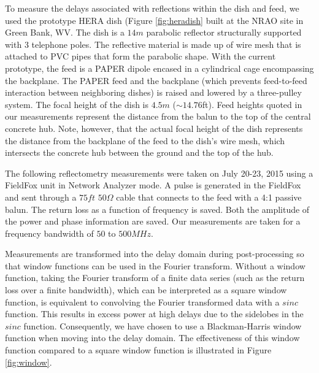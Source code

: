 \documentclass[12pt,preprint]{aastex}
\begin{document}
To measure the delays associated with reflections within the dish and feed, we
used the prototype HERA dish (Figure \ref{fig:heradish} built at the NRAO site in
Green Bank, WV. The dish is a $14m$ parabolic reflector structurally supported
with 3 telephone poles. The reflective material is made up of wire mesh that
is attached to PVC pipes that form the parabolic shape. With the current
prototype, the feed is a PAPER dipole encased in a cylindrical cage encompassing
the backplane. The PAPER feed and the backplane (which prevents feed-to-feed
interaction between neighboring dishes) is raised and lowered by a three-pulley
system. The focal height of the dish is $4.5m$ ($\sim{14.76}$ft). Feed heights quoted in our measurements represent the distance from the balun to the top of the central concrete hub. Note, however, that the actual focal height of the dish represents the distance from the backplane of the feed to the dish's wire mesh, which intersects the concrete hub between the ground and the top of the hub. 

The following reflectometry measurements were taken on July 20-23, 2015 using a
FieldFox unit in Network Analyzer mode. A pulse is generated in the FieldFox
and sent through a $75ft$ $50\Omega$ cable that connects to the feed with a 4:1
passive balun. The return loss as a function of frequency is saved. Both
the amplitude of the power and phase information are saved. Our
measurements are taken for a frequency bandwidth of $50$ to $500MHz$. 

Measurements are transformed into the delay domain during post-processing so that window functions
can be used in the Fourier transform. Without a window function, taking the Fourier transform of a finite data series (such as the return loss over a finite bandwidth), which can be interpreted as a square window function, is equivalent to convolving the Fourier transformed data with a $sinc$ function. This results in excess power at high delays due to the sidelobes in the $sinc$ function. Consequently, we have chosen to use a Blackman-Harris window function when moving into the delay domain. The effectiveness of this window function compared to a square window function is illustrated in Figure \ref{fig:window}.
\end{document}
